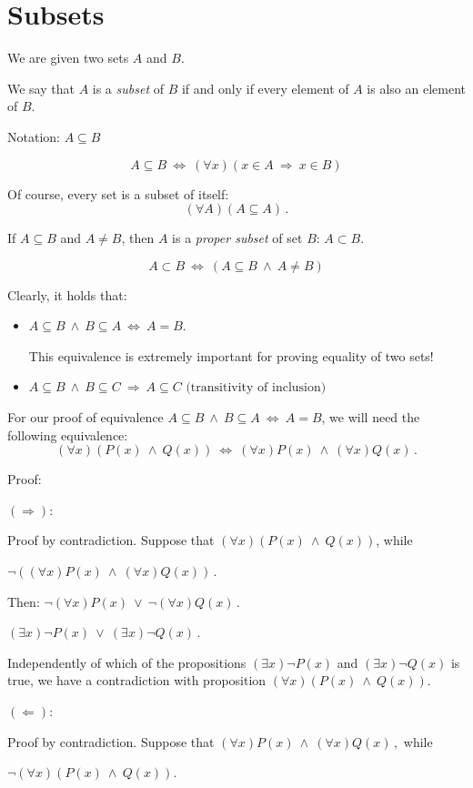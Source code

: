 \documentclass[11pt,paper=b5,footinclude,headinclude]{scrbook} %
\def\ali {{~\vee~}}
\def\inn {{~\wedge~}}
\def\sledi {{~\Rightarrow~}}
\def\cee {{~\Leftrightarrow~}}
\theoremstyle{remark}
\theoremstyle{definition} %
\theoremstyle{theorem} %
\begin{document}
\section{Subsets}
We are given two sets $A$ and $B$.

We say that $A$ is a {\em subset} of $B$ if and only if every element of $A$ is also an element of  $B$.

Notation: $A\subseteq B$

$$A\subseteq B\cee (\forall x)(x\in A\sledi x\in B)$$

Of course, every set is a subset of itself: $$(\forall A)(A\subseteq A)\,.$$

If $A\subseteq B$ and $A\neq B$, then $A$ is a  {\em proper subset } of set $B$: $A\subset B$.

$$A\subset B\cee (A\subseteq B \inn A\neq B)$$

Clearly, it holds that:
\begin{itemize}
  \item $A\subseteq B \inn B\subseteq A \cee A = B$.

  This equivalence is extremely important for proving equality of two sets!
  \item $A\subseteq B \inn B\subseteq C \sledi A \subseteq C \textrm{~(transitivity of inclusion)}$
\end{itemize}

For our proof of equivalence $A\subseteq B \inn B\subseteq A \cee A = B$, we will need the following
equivalence:
$$(\forall x)(P(x)\inn Q(x))\cee (\forall x)P(x)\inn (\forall x)Q(x)\,.$$

Proof:

$(\Rightarrow)$:

Proof by contradiction.
Suppose that $(\forall x)(P(x)\inn Q(x))$, while

$\neg((\forall x)P(x)\inn (\forall x)Q(x))\,.$

Then:
$\neg(\forall x)P(x)\ali \neg (\forall x)Q(x)\,.$

$(\exists  x)\neg P(x)\ali (\exists x)\neg Q(x)\,.$

Independently of which of the propositions $(\exists  x)\neg P(x)$
and $(\exists  x)\neg Q(x)$ is true, we have a contradiction with proposition
$(\forall x)(P(x)\inn Q(x))$.

$(\Leftarrow)$:

Proof by contradiction.
Suppose that $(\forall x)P(x)\inn (\forall x)Q(x)\,,$ while

$\neg (\forall x)(P(x)\inn Q(x))$.
\end{document}
